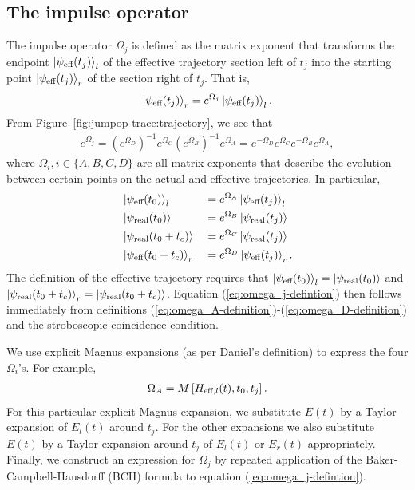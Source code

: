\subsection{The impulse operator}
\newcommand{\evolexp}[1]{e^{#1}}
The impulse operator $\Omega_j$ is defined as the matrix exponent  that transforms the endpoint $\ket{\psi_{\text{eff}}(t_j)}_l$ of the effective trajectory section left of $t_j$ into the starting point $\ket{\psi_{\text{eff}}(t_j)}_r$ of the section right of $t_j$. That is,
\begin{align}
	\ket{\psi_{\eff}(t_j)}_r = \evolexp{\Omega_j} \ket{\psi_{\eff}(t_j)}_l.
\end{align}
From Figure~\ref{fig:jumpop-trace:trajectory}, we see that
\begin{align}
	\evolexp{\Omega_j} = (\evolexp{\Omega_D})^{-1} \evolexp{\Omega_C} (\evolexp{\Omega_B})^{-1} \evolexp{\Omega_A} = \evolexp{-\Omega_D} \evolexp{\Omega_C} \evolexp{-\Omega_B} \evolexp{\Omega_A},
	\label{eq:omega_j-defintion}
\end{align}
where $\Omega_i, i \in \{A,B,C,D\}$ are all matrix exponents that describe the evolution between certain points on the actual and effective trajectories. In particular,
\begin{alignat}{2}
	&\ket{\psi_\eff(t_0)}_l &&= \evolexp{\Omega_A} \ket{\psi_\eff(t_j)}_l \label{eq:omega_A-definition} \\
	&\ket{\psi_\real(t_0)} &&= \evolexp{\Omega_B} \ket{\psi_\real(t_j)} \label{eq:omega_B-definition} \\
	&\ket{\psi_\real(t_0+t_c)} &&= \evolexp{\Omega_C} \ket{\psi_\real(t_j)} \label{eq:omega_C-definition} \\
	&\ket{\psi_\eff(t_0+t_c)}_r &&= \evolexp{\Omega_D} \ket{\psi_\eff(t_j)}_r. \label{eq:omega_D-definition}
\end{alignat}
The definition of the effective trajectory requires that $\ket{\psi_{\text{eff}}(t_0)}_l = \ket{\psi_{\text{real}}(t_0)}$ and $\ket{\psi_{\text{real}}(t_0+t_c)}_r = \ket{\psi_{\text{real}}(t_0+t_c)}$. Equation (\ref{eq:omega_j-defintion}) then follows immediately from definitions (\ref{eq:omega_A-definition})-(\ref{eq:omega_D-definition}) and the stroboscopic coincidence condition.

We use explicit Magnus expansions (as per Daniel's definition) to express the four $\Omega_i$'s. For example,
\begin{align}
	\Omega_A = M\left[H_{\text{eff},l}(t), t_0, t_j\right].
	\label{eq:Omega_A-explicit-ME}
\end{align}
For this particular explicit Magnus expansion, we substitute $E(t)$ by a Taylor expansion of $E_l(t)$ around $t_j$. For the other expansions we also substitute $E(t)$ by a Taylor expansion around $t_j$ of $E_l(t)$ or $E_r(t)$ appropriately. Finally, we construct an expression for $\Omega_j$ by repeated application of the Baker-Campbell-Hausdorff (BCH) formula to equation (\ref{eq:omega_j-defintion}).

